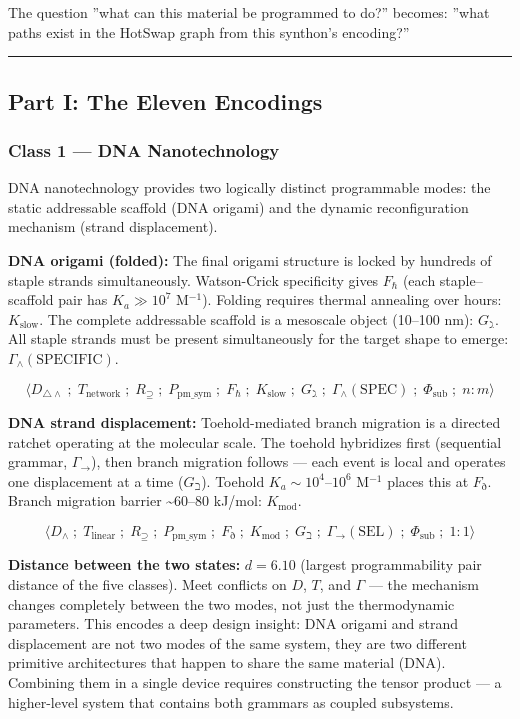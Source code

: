 \documentclass[12pt,a4paper]{article}
\begin{document}
The question ''what can this material be programmed to do?'' becomes: ''what paths exist in the HotSwap graph from this synthon's encoding?''

\begin{center}
\rule{0.5\textwidth}{0.4pt}
\end{center}

\subsection{Part I: The Eleven Encodings}

\subsubsection{Class 1 --- DNA Nanotechnology}

DNA nanotechnology provides two logically distinct programmable modes: the static addressable scaffold (DNA origami) and the dynamic reconfiguration mechanism (strand displacement).

\textbf{DNA origami (folded):} The final origami structure is locked by hundreds of staple strands simultaneously. Watson-Crick specificity gives $F_\hbar$ (each staple--scaffold pair has $K_a \gg 10^7$ M$^{-1}$). Folding requires thermal annealing over hours: $K_\text{slow}$. The complete addressable scaffold is a mesoscale object (10--100 nm): $G_\gimel$. All staple strands must be present simultaneously for the target shape to emerge: $\Gamma_\wedge(\text{SPECIFIC})$.

\[\langle D_{\triangle\wedge} \;;\; T_\text{network} \;;\; R_{\supseteq} \;;\; P_{\text{pm\_sym}} \;;\; F_\hbar \;;\; K_\text{slow} \;;\; G_\gimel \;;\; \Gamma_\wedge(\text{SPEC}) \;;\; \Phi_\text{sub} \;;\; n:m \rangle\]

\textbf{DNA strand displacement:} Toehold-mediated branch migration is a directed ratchet operating at the molecular scale. The toehold hybridizes first (sequential grammar, $\Gamma_\to$), then branch migration follows --- each event is local and operates one displacement at a time ($G_\beth$). Toehold $K_a \sim 10^4$--$10^6$ M$^{-1}$ places this at $F_\eth$. Branch migration barrier \textasciitilde{}60--80 kJ/mol: $K_\text{mod}$.

\[\langle D_\wedge \;;\; T_\text{linear} \;;\; R_{\supseteq} \;;\; P_{\text{pm\_sym}} \;;\; F_\eth \;;\; K_\text{mod} \;;\; G_\beth \;;\; \Gamma_\to(\text{SEL}) \;;\; \Phi_\text{sub} \;;\; 1:1 \rangle\]

\textbf{Distance between the two states:} $d = 6.10$ (largest programmability pair distance of the five classes). Meet conflicts on $D$, $T$, and $\Gamma$ --- the mechanism changes completely between the two modes, not just the thermodynamic parameters. This encodes a deep design insight: DNA origami and strand displacement are not two modes of the same system, they are two different primitive architectures that happen to share the same material (DNA). Combining them in a single device requires constructing the tensor product --- a higher-level system that contains both grammars as coupled subsystems.
\end{document}
